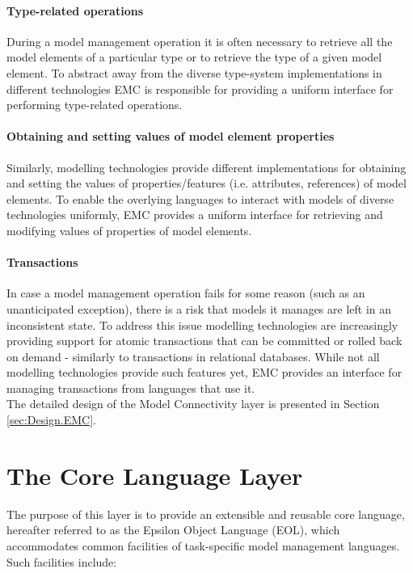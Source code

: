 \paragraph{Type-related operations} During a model management operation it is often necessary to retrieve all the model elements of a particular type or to retrieve the type of a given model element. To abstract away from the diverse type-system implementations in different technologies EMC is responsible for providing a uniform interface for performing type-related operations.

\paragraph{Obtaining and setting values of model element properties} Similarly, modelling technologies provide different implementations for obtaining and setting the values of properties/features (i.e. attributes, references) of model elements. To enable the overlying languages to interact with models of diverse technologies uniformly, EMC provides a uniform interface for retrieving and modifying values of properties of model elements.

\paragraph{Transactions} In case a model management operation fails for some reason (such as an unanticipated exception), there is a risk that models it manages are left in an inconsistent state. To address this issue modelling technologies are increasingly providing support for atomic transactions that can be committed or rolled back on demand - similarly to transactions in relational databases. While not all modelling technologies provide such features yet, EMC provides an interface for managing transactions from languages that use it.\\

\noindent The detailed design of the Model Connectivity layer is presented in Section \ref{sec:Design.EMC}.

\section{The Core Language Layer}
\label{sec:Architecture.EOL}
The purpose of this layer is to provide an extensible and reusable core language, hereafter referred to as the Epsilon Object Language (EOL), which accommodates common facilities of task-specific model management languages. Such facilities include:

